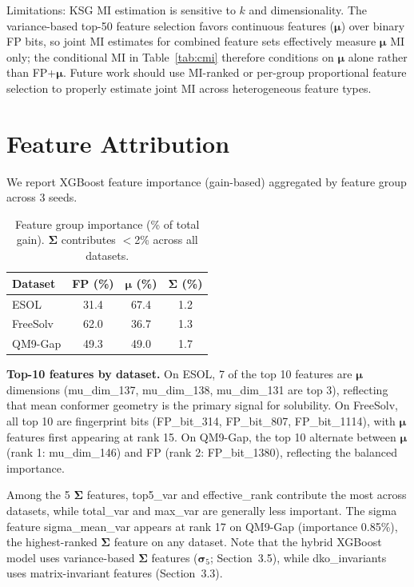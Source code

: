 \documentclass[sigconf]{acmart}
\begin{document}
Limitations: KSG MI estimation is sensitive to $k$ and dimensionality. The variance-based top-50 feature selection favors continuous features ($\boldsymbol{\mu}$) over binary FP bits, so joint MI estimates for combined feature sets effectively measure $\boldsymbol{\mu}$ MI only; the conditional MI in Table~\ref{tab:cmi} therefore conditions on $\boldsymbol{\mu}$ alone rather than FP+$\boldsymbol{\mu}$. Future work should use MI-ranked or per-group proportional feature selection to properly estimate joint MI across heterogeneous feature types.

\section{Feature Attribution}
\label{app:attrib}

We report XGBoost feature importance (gain-based) aggregated by feature group across 3 seeds.

\begin{table}[ht]
\caption{Feature group importance (\% of total gain). $\boldsymbol{\Sigma}$ contributes $<$2\% across all datasets.}
\label{tab:attrib}
\centering
\small
\begin{tabular}{@{}lccc@{}}
\toprule
Dataset & FP (\%) & $\boldsymbol{\mu}$ (\%) & $\boldsymbol{\Sigma}$ (\%) \\
\midrule
ESOL     & 31.4 & 67.4 & 1.2 \\
FreeSolv & 62.0 & 36.7 & 1.3 \\
QM9-Gap  & 49.3 & 49.0 & 1.7 \\
\bottomrule
\end{tabular}
\end{table}

\textbf{Top-10 features by dataset.} On ESOL, 7 of the top 10 features are $\boldsymbol{\mu}$ dimensions (mu\_dim\_137, mu\_dim\_138, mu\_dim\_131 are top 3), reflecting that mean conformer geometry is the primary signal for solubility. On FreeSolv, all top 10 are fingerprint bits (FP\_bit\_314, FP\_bit\_807, FP\_bit\_1114), with $\boldsymbol{\mu}$ features first appearing at rank 15. On QM9-Gap, the top 10 alternate between $\boldsymbol{\mu}$ (rank 1: mu\_dim\_146) and FP (rank 2: FP\_bit\_1380), reflecting the balanced importance.

Among the 5 $\boldsymbol{\Sigma}$ features, top5\_var and effective\_rank contribute the most across datasets, while total\_var and max\_var are generally less important. The sigma feature sigma\_mean\_var appears at rank 17 on QM9-Gap (importance 0.85\%), the highest-ranked $\boldsymbol{\Sigma}$ feature on any dataset. Note that the hybrid XGBoost model uses variance-based $\boldsymbol{\Sigma}$ features ($\boldsymbol{\sigma}_5$; Section~3.5), while dko\_invariants uses matrix-invariant features (Section~3.3).
\end{document}
